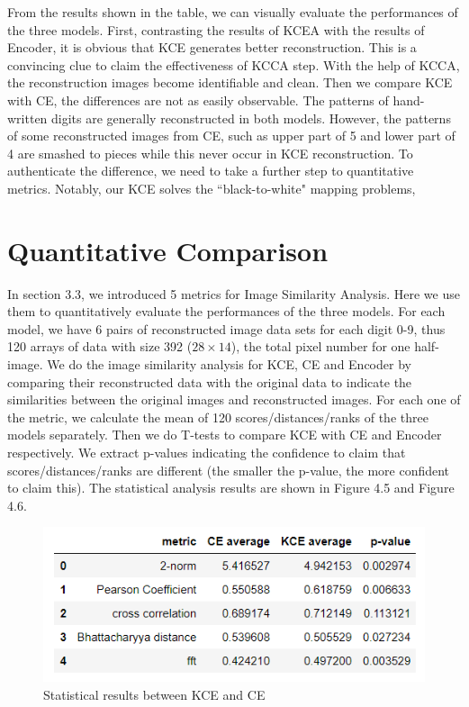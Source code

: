\documentclass[12pt]{report} %
\begin{document}
From the results shown in the table, we can visually evaluate the performances of the three models. First, contrasting the results of KCEA with the results of Encoder, it is obvious that KCE generates better reconstruction. This is a convincing clue to claim the effectiveness of KCCA step. With the help of KCCA, the reconstruction images become identifiable and clean. Then we compare KCE with CE, the differences are not as easily observable. The patterns of hand-written digits are generally reconstructed in both models. However, the patterns of some reconstructed images from CE, such as upper part of 5 and lower part of 4 are smashed to pieces while this never occur in KCE reconstruction. To authenticate the difference, we need to take a further step to quantitative metrics. Notably, our KCE solves the ``black-to-white" mapping problems,

\section{Quantitative Comparison}
In section 3.3, we introduced 5 metrics for Image Similarity Analysis. Here we use them to quantitatively evaluate the performances of the three models. For each model, we have 6 pairs of reconstructed image data sets for each digit 0-9, thus 120 arrays of data with size 392 ($28 \times 14$), the total pixel number for one half-image. We do the image similarity analysis for KCE, CE and Encoder by comparing their reconstructed data with the original data to indicate the similarities between the original images and reconstructed images. For each one of the metric, we calculate the mean of 120 scores/distances/ranks of the three models separately. Then we do T-tests\cite{TTEST} to compare KCE with CE and Encoder respectively. We extract p-values indicating the confidence to claim that scores/distances/ranks are different (the smaller the p-value, the more confident to claim this). The statistical analysis results are shown in Figure 4.5 and Figure 4.6.

\begin{figure}[H]
	\centering
	\includegraphics[scale=1.2]{pictures/KE-M1.png}
	\caption{Statistical results between KCE and CE}
	\label{fig:5}
\end{figure}
\end{document}
